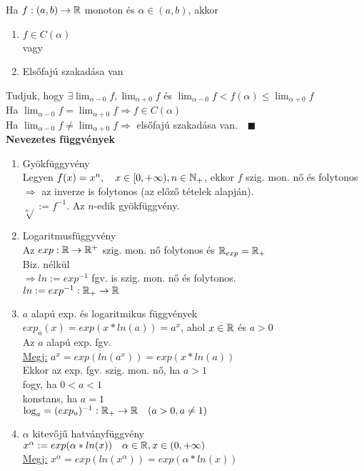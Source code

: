 \documentclass[a4paper,11pt]{article}
\begin{document}
\tetel Ha $f:(a,b)\to\mathbb{R}$ monoton és $\alpha\in(a,b)$, akkor
\begin{enumerate}
	\item $f\in C(\alpha)$\\[0.3cm] \hspace*{0.1cm} vagy
	\item Elsőfajú szakadása van
\end{enumerate}
\biz Tudjuk, hogy $\exists\displaystyle\lim_{\alpha-0} f, \displaystyle\lim_{\alpha+0} f$ és $\displaystyle\lim_{\alpha-0} f < f(\alpha)\leq \displaystyle\lim_{\alpha+0} f$\\[0.1cm] Ha $\displaystyle\lim_{\alpha-0} f= \displaystyle\lim_{\alpha+0} f\Rightarrow f\in C(\alpha)$\\[0.1cm] Ha $\displaystyle\lim_{\alpha-0} f\neq\displaystyle\lim_{\alpha+0} f\Rightarrow$ elsőfajú szakadása van.$\quad\blacksquare$\\[0.3cm]
\textbf{{\Large Nevezetes függvények}}
\begin{enumerate}
	\item Gyökfüggyvény \\ Legyen $f(x)=x^n,\quad x\in[0,+\infty), n\in\mathbb{N}_+$, ekkor $f$ szig. mon. nő és folytonos\\[0.1cm] $\Rightarrow$ az inverze is folytonos (az előző tételek alapján).\\[0.1cm]  $\sqrt[n]{} := f^{-1}$. Az $n$-edik gyökfüggvény.
	\item Logaritmusfüggyvény \\ \tetel Az $exp:\mathbb{R}\to\mathbb{R}^+$ szig. mon. nő folytonos és $\mathbb{R}_{exp}=\mathbb{R}_+$ \\[0.1cm] \biz Biz. nélkül\\[0.1cm]$\Rightarrow ln:=exp^{-1}$ fgv. is szig. mon. nő és folytonos.\\[0.1cm]  $ln:=exp^{-1}:\mathbb{R}_+\to\mathbb{R}$
	\item $a$ alapú exp. és logaritmikus függvények\\[0.1cm] $exp_a(x)=exp(x*ln(a))=a^x$, ahol $x\in\mathbb{R}$ és $a>0$\\[0.1cm] Az $a$ alapú exp. fgv.\\[0.1cm]\hspace*{0.3cm} \underline{Megj:} $a^x=exp(ln(a^x))=exp(x*ln(a))$ \\[0.1cm]Ekkor az exp. fgv. szig. mon. nő, ha $a>1$\\[0.1cm]\hspace*{4.6cm} fogy, ha $0<a<1$\\[0.1cm]\hspace*{3.9cm} konstans, ha $a=1$\\[0.1cm]  $\log_a=(exp_a)^{-1}:\mathbb{R}_+\to\mathbb{R}\quad(a>0,a\neq1)$
	\item $\alpha$ kitevőjű hatványfüggvény\\[0.1cm] $x^{\alpha}:=exp(\alpha*ln(x))\quad\alpha\in\mathbb{R},x\in(0,+\infty)$ \\[0.1cm]\hspace*{0.3cm} \underline{Megj:} $x^\alpha=exp(ln(x^\alpha))= exp(\alpha*ln(x))$
\end{enumerate}
\end{document}
